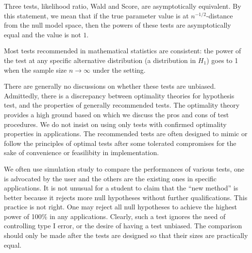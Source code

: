 Three tests, likelihood ratio, Wald and Score,
are asymptotically equivalent. 
By this statement, we mean that if the true parameter value
is at $n^{-1/2}$-distance from the null model space, then the powers of
these tests are asymptotically equal and the value is not $1$.

Most tests recommended in mathematical statistics are consistent:
the power of the test at any specific alternative distribution (a distribution in
$H_1$) goes to 1 when the sample size $n \to \infty$
under the \iid setting.

There are generally no discussions on whether these tests are
unbiased. Admittedly, there is a discrepancy between optimality
theories for hypothesis test, and the properties of generally recommended
tests. The optimality theory provides a high ground based on which we discuss
the pros and cons of test procedures. We do not insist on using
only tests with confirmed optimality properties in applications.
The recommended tests are often designed to mimic or follow
the principles of optimal tests after some tolerated compromises
for the sake of convenience or feasilibity in implementation.

We often use simulation study to compare the
performances of various tests, one is advocated by the user and
the others are the existing ones in specific applications. 
It is not unusual
for a student to claim that the ``new method'' is better because
it rejects more null hypotheses without further qualifications.
This practice is not right.
One may reject all null hypotheses to achieve the highest power
of 100\% in any applications. Clearly, such a test ignores the
need of controlling type I error, or the desire of having a test
unbiased.
The comparison should only be made after the tests are designed
so that their sizes are practically equal. 

